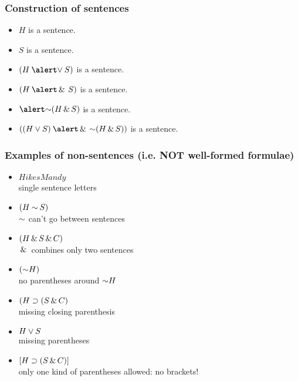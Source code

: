 \begin{frame}
  \frametitle{Construction of sentences}

  \begin{itemize}[<+->]
    \item $H$ is a sentence.
    \item $S$ is a sentence.
    \item $(H \mathbin{\emph{\eor}} S)$ is a sentence.
    \item $(H \mathbin{\emph{\eand}} S)$ is a sentence.
    \item $\emph{\enot} (H \eand S)$ is a sentence.
    \item $((H \eor S) \mathbin{\emph{\eand}} \enot (H \eand S))$ is a sentence.
  \end{itemize}


\end{frame}

\begin{frame}
  \frametitle{Examples of non-sentences (i.e. NOT well-formed formulae)}

  \begin{itemize}
    \item $\mathit{HikesMandy}$\\
    \qquad single sentence letters
    \item $(H \mathbin{\enot} S)$\\
    \qquad$\enot$ can't go between sentences
    \item $(H \,\&\, S \,\&\, C)$\\
    \qquad $\,\&\,$ combines only two sentences
    \item $(\enot H)$\\
    \qquad no parentheses around $\enot H$
    \item $(H \supset (S \,\&\, C)$\\
    \qquad missing closing parenthesis
    \item $H \vee S$\\
    \qquad missing parentheses
    \item $[H \supset (S \,\&\, C)]$\\
    \qquad only one kind of parentheses allowed: no brackets! 
  \end{itemize}

\end{frame}

